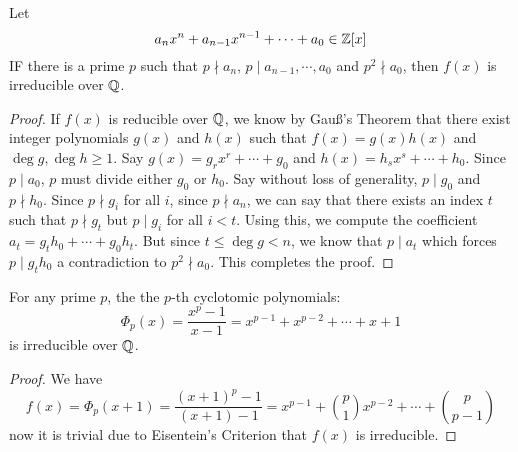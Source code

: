 \begin{theorem}
	Let 
	$$
	a_nx^n + a_{n-1}x^{n-1} + \cdots + a_0 \in \mathbb{Z}[x]
	$$
	IF there is a prime $p$ such that $p\nmid a_n$, $p\mid a_{n-1},\cdots,a_0$ and $p^2\nmid a_0$, then $f(x)$ is irreducible over $\mathbb{Q}$.
\end{theorem}
\begin{proof}
	If $f(x)$ is reducible over $\mathbb{Q}$, we know by Gauß's Theorem that there exist integer polynomials $g(x)$ and $h(x)$ such that $f(x) = g(x)h(x)$ and $\deg g,\deg h\ge 1$. Say $g(x) = g_rx^r+\cdots+g_0$ and $h(x)=h_sx^s+\cdots+h_0$. Since $p\mid a_0$, $p$ must divide either $g_0$ or $h_0$. Say without loss of generality, $p\mid g_0$ and $p\nmid h_0$. Since $p\nmid g_i$ for all $i$, since $p\nmid a_n$, we can say that there exists an index $t$ such that $p\nmid g_t$ but $p\mid g_i$ for all $i<t$. Using this, we compute the coefficient $a_t=g_th_0+\cdots+g_0h_t$. But since $t\le\deg g<n$, we know that $p\mid a_t$ which forces $p\mid g_th_0$ a contradiction to $p^2\nmid a_0$. This completes the proof.
\end{proof}

\begin{corollary}
	For any prime $p$, the the $p$-th cyclotomic polynomials:
	\begin{equation*}
		\Phi_p(x) = \frac{x^p-1}{x-1} = x^{p-1} + x^{p-2} + \cdots + x + 1
	\end{equation*}
	is irreducible over $\mathbb{Q}$.
\end{corollary}
\begin{proof}
	We have 
	\begin{equation*}
		f(x) = \Phi_p(x+1) = \frac{(x+1)^p-1}{(x+1)-1} = x^{p-1} + \binom{p}{1}x^{p-2} + \cdots + \binom{p}{p-1}
	\end{equation*}
	now it is trivial due to Eisentein's Criterion that $f(x)$ is irreducible.
\end{proof}


